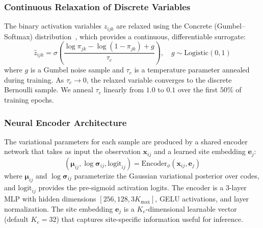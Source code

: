 \documentclass[11pt,a4paper]{article}
\theoremstyle{definition}
\begin{document}
\subsubsection{Continuous Relaxation of Discrete Variables}
The binary activation variables $z_{ijk}$ are relaxed using the Concrete (Gumbel--Softmax) distribution~\citep{maddison2017,jang2017}, which provides a continuous, differentiable surrogate:
\begin{equation}
  \hat{z}_{ijk} = \sigma\!\left(\frac{\log \pi_{jk} - \log(1{-}\pi_{jk}) + g}{\tau_c}\right), \quad g \sim \text{Logistic}(0,1) \label{eq:concrete}
\end{equation}
where $g$ is a Gumbel noise sample and $\tau_c$ is a temperature parameter annealed during training. As $\tau_c \to 0$, the relaxed variable converges to the discrete Bernoulli sample. We anneal $\tau_c$ linearly from $1.0$ to $0.1$ over the first $50\%$ of training epochs.

\subsubsection{Neural Encoder Architecture}
The variational parameters for each sample are produced by a shared encoder network that takes as input the observation $\mathbf{x}_{ij}$ and a learned site embedding $\mathbf{e}_j$:
\begin{equation}
  (\boldsymbol{\mu}_{ij}, \log\boldsymbol{\sigma}_{ij}, \mathrm{logit}_{ij}) = \mathrm{Encoder}_\phi(\mathbf{x}_{ij}, \mathbf{e}_j) \label{eq:encoder}
\end{equation}
where $\boldsymbol{\mu}_{ij}$ and $\log\boldsymbol{\sigma}_{ij}$ parameterize the Gaussian variational posterior over codes, and $\mathrm{logit}_{ij}$ provides the pre-sigmoid activation logits. The encoder is a 3-layer MLP with hidden dimensions $[256, 128, 3K_{\max}]$, GELU activations, and layer normalization. The site embedding $\mathbf{e}_j$ is a $K_e$-dimensional learnable vector (default $K_e{=}32$) that captures site-specific information useful for inference.
\end{document}

